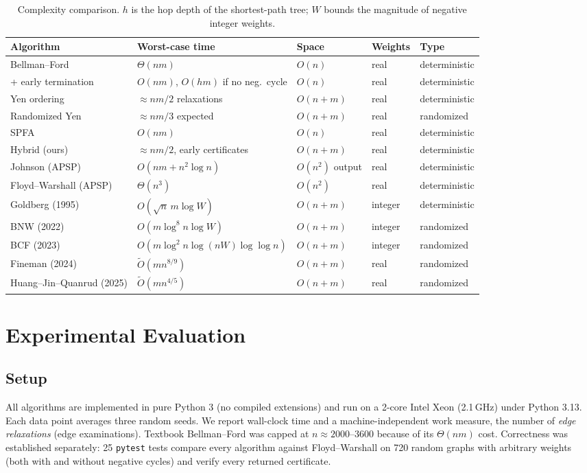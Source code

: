 \documentclass[11pt,a4paper]{article}
\theoremstyle{definition}
\newcommand{\Ot}{\tilde{O}}
\begin{document}
\begin{table}[H]
\centering
\small
\begin{tabular}{@{}lllll@{}}
\toprule
\textbf{Algorithm} & \textbf{Worst-case time} & \textbf{Space} & \textbf{Weights} & \textbf{Type}\\
\midrule
Bellman--Ford & $\Theta(nm)$ & $O(n)$ & real & deterministic\\
+ early termination & $O(nm)$, $O(hm)$ if no neg.\ cycle & $O(n)$ & real & deterministic\\
Yen ordering & $\approx nm/2$ relaxations & $O(n+m)$ & real & deterministic\\
Randomized Yen & $\approx nm/3$ expected & $O(n+m)$ & real & randomized\\
SPFA & $O(nm)$ & $O(n)$ & real & deterministic\\
Hybrid (ours) & $\approx nm/2$, early certificates & $O(n+m)$ & real & deterministic\\
Johnson (APSP) & $O(nm+n^2\log n)$ & $O(n^2)$ output & real & deterministic\\
Floyd--Warshall (APSP) & $\Theta(n^3)$ & $O(n^2)$ & real & deterministic\\
\midrule
Goldberg (1995) & $O(\sqrt n\, m\log W)$ & $O(n+m)$ & integer & deterministic\\
BNW (2022) & $O(m\log^8 n\log W)$ & $O(n+m)$ & integer & randomized\\
BCF (2023) & $O(m\log^2 n\log(nW)\log\log n)$ & $O(n+m)$ & integer & randomized\\
Fineman (2024) & $\Ot(mn^{8/9})$ & $O(n+m)$ & real & randomized\\
Huang--Jin--Quanrud (2025) & $\Ot(mn^{4/5})$ & $O(n+m)$ & real & randomized\\
\bottomrule
\end{tabular}
\caption{Complexity comparison. $h$ is the hop depth of the shortest-path tree; $W$ bounds the magnitude of negative integer weights.}
\label{tab:complexity}
\end{table}

\section{Experimental Evaluation}
\label{sec:experiments}


\subsection{Setup}
All algorithms are implemented in pure Python 3 (no compiled extensions) and run on a 2-core Intel Xeon (2.1\,GHz) under Python 3.13. Each data point averages three random seeds. We report wall-clock time and a machine-independent work measure, the number of \emph{edge relaxations} (edge examinations). Textbook Bellman--Ford was capped at $n\approx 2000$--$3600$ because of its $\Theta(nm)$ cost. Correctness was established separately: 25 \texttt{pytest} tests compare every algorithm against Floyd--Warshall on 720 random graphs with arbitrary weights (both with and without negative cycles) and verify every returned certificate.
\end{document}
